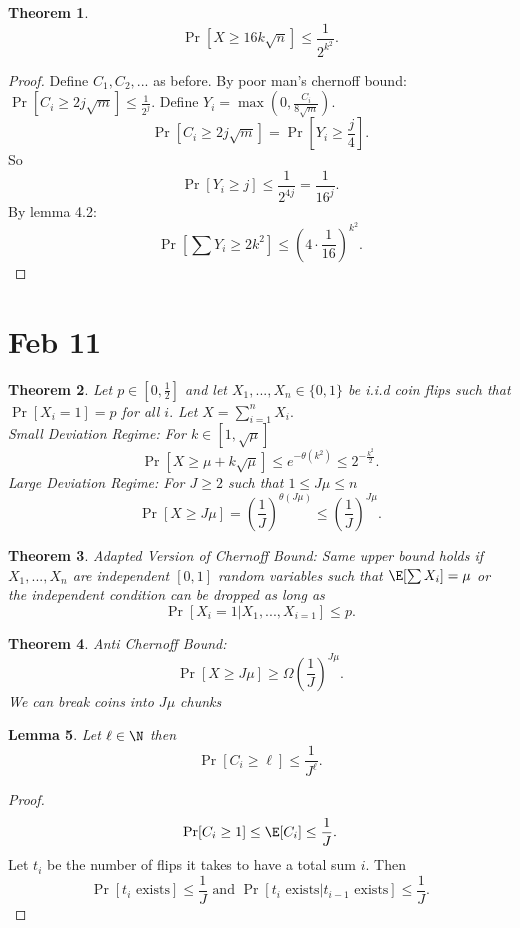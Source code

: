 \documentclass[a4paper]{article}
\newtheorem{thm}{Theorem}[section]
\newtheorem{lem}[thm]{Lemma}
\begin{document}
\begin{thm}
    \[
    \Pr[X\geq 16k\sqrt{n}] \leq \frac{1}{2^{k^2}}
    .\] 
\end{thm}
\begin{proof}
    Define $C_1,C_2,...$ as before. By poor man's chernoff bound: $\Pr[C_i \geq 2j\sqrt{m}]\leq \frac{1}{2^j}$. Define $Y_i=\max(0,\frac{C_i}{8\sqrt{m}})$. 
    \[
    \Pr[C_i \geq 2j\sqrt{m}]=\Pr\left [Y_i \geq \frac{j}{4}\right ] 
    .\] 
    So \[
    \Pr[Y_i \geq j]\leq \frac{1}{2^{4j}}=\frac{1}{16^j}
    .\] 
    By lemma 4.2: 
    \[
    \Pr\left [\sum Y_i \geq 2k^2\right ] \leq \left (4 \cdot \frac{1}{16}\right )^{k^2}
    .\] 
\end{proof}
\newpage
\section{Feb 11}
\begin{thm}
    Let $p\in [0,\frac{1}{2}]$ and let $X_1,...,X_n\in \{0,1\}$ be i.i.d coin flips such that $\Pr[X_i=1]=p$ for all $i.$ Let $X=\sum_{i=1}^n X_i.$ \\
    Small Deviation Regime: For $k\in [1,\sqrt{\mu}]$ \[
    \Pr[X \geq \mu +k \sqrt{\mu}] \leq e^{-\theta(k^2)}\leq 2^{-\frac{k^2}{2}}
    .\] 
    Large Deviation Regime: For $J\geq 2$ such that $1\leq J \mu \leq n$ 
    \[
    \Pr[X\geq J\mu]= \left(  \frac{1}{J} \right)^{\theta (J\mu)} \leq  \left( \frac{1}{J} \right)^{J\mu }
    .\] 
\end{thm}
\begin{thm}
    Adapted Version of Chernoff Bound:
    Same upper bound holds if $X_1,...,X_n$ are independent $[0,1]$ random variables such that $\E[\sum X_i]=\mu$ or the independent condition can be dropped as long as \[
    \Pr[X_i=1 | X_1,...,X_{i=1}]\leq p
    .\] 
\end{thm}
\begin{thm}
    Anti Chernoff Bound: \[
        \Pr[X\geq J \mu]\geq \Omega \left( \frac{1}{J} \right)^{J \mu}
    .\] 
    We can break coins into $J \mu$ chunks 
\end{thm}
\begin{lem}
    Let $\ell \in \N$ then \[
    \Pr[C_i \geq \ell] \leq \frac{1}{J^\ell}
    .\] 
\end{lem}
\begin{proof}
    \[
    \Pr[C_i \geq 1] \leq \E[C_i]\leq \frac{1}{J}
    .\] 
    Let $t_i$ be the number of flips it takes to have a total sum $i$. Then \[
    \Pr[t_i \text{ exists}]\leq \frac{1}{J} \text{ and }\Pr[t_i \text{ exists} | t_{i-1} \text{ exists}]\leq \frac{1}{J} 
    .\] 
\end{proof}
\end{document}
